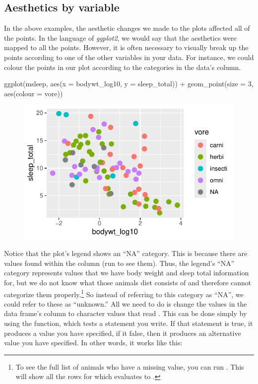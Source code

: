 \subsection{Aesthetics by variable}

In the above examples, the aesthetic changes we made to the plots affected all of the points. In the language of \textit{ggplot2}, we would say that the aesthetics were mapped to all the points. However, it is often necessary to visually break up the points according to one of the other variables in your data.  For instance, we could colour the points in our plot according to the categories in the data's  column.

\begin{inR}
ggplot(msleep, aes(x = bodywt_log10, y = sleep_total)) +
    geom_point(size = 3, aes(colour = vore))
\end{inR}

\vspace{2em}

\begin{figure}[H]
\includegraphics[scale = 0.75]{graphics/ch2Figs/ggEx_7.pdf}
\end{figure}

\noindent
Notice that the plot's legend shows an ``NA'' category. This is because there are  values found within the  column (run  to see them). Thus, the legend's ``NA'' category represents values that we have body weight and sleep total information for, but we do not know what those animals diet consists of and therefore cannot categorize them properly.\footnote{To see the full list of animals who have a missing  value, you can run . This will show all the rows for which  evaluates to .} So instead of referring to this category as ``NA'', we could refer to these as ``unknown.'' All we need to do is change the  values in the data frame's  column to character values that read . This can be done simply by using the  function, which tests a statement you write. If that statement is true, it produces a value you have specified, if it false, then it produces an alternative value you have specified.  In other words, it works like this: 

